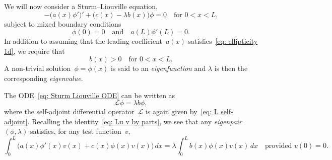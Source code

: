 We will now consider a Sturm--Liouville equation,
\begin{equation}\label{eq: Sturm Liouville ODE}
-\bigl(a(x)\phi'\bigr)'+\bigl(c(x)-\lambda b(x)\bigr)\phi=0\quad
	\text{for $0<x<L$,}
\end{equation}
subject to mixed boundary conditions
\begin{equation}\label{eq: Sturm Liouville bc}
\phi(0)=0\quad\text{and}\quad a(L)\phi'(L)=0.
\end{equation}
In addition to assuming that the leading coefficient~$a(x)$ 
satisfies~\eqref{eq: ellipticity 1d}, we require that
\begin{equation}\label{eq: b>0}
b(x)>0\quad\text{for $0<x<L$.}
\end{equation}
A non-trivial solution~$\phi=\phi(x)$ is said to an \emph{eigenfunction} and 
$\lambda$ is then the corresponding \emph{eigenvalue}.  

The ODE~\eqref{eq: Sturm Liouville ODE} can be written as
\[
\mathcal{L}\phi=\lambda b\phi,
\]
where the self-adjoint differential operator~$\mathcal{L}$ is again given 
by~\eqref{eq: L self-adjoint}.  Recalling the 
identity~\eqref{eq: Lu v by parts}, we see that any \emph{eigenpair} 
$(\phi,\lambda)$ satisfies, for any test function~$v$,
\[
\int_0^L\bigl(a(x)\phi'(x)v(x)+c(x)\phi(x)v(x)\bigr)\,dx
	=\lambda\int_0^Lb(x)\phi(x)v(x)\,dx
\quad\text{provided $v(0)=0$.}
\]

